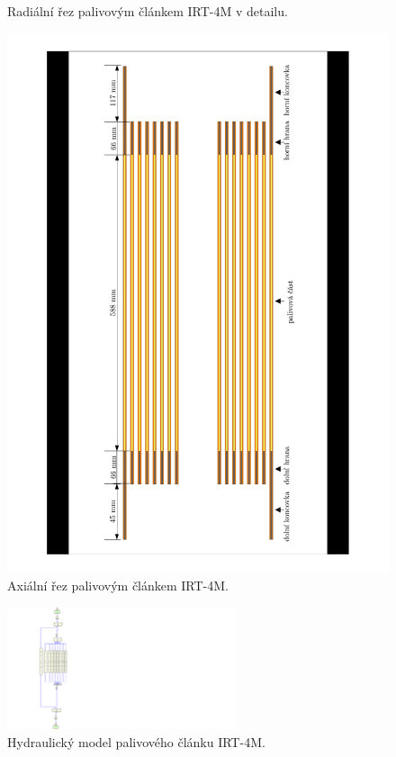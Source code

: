 \begin{figure}
\begin{minipage}{.5\textwidth}
{		\caption{Radiální řez palivovým článkem IRT-4M v detailu.}
		\label{fig:detail_irt_serpent}
	}
	\end{minipage}%
	\begin{minipage}{.5\textwidth}
		\centering
		\includegraphics[width=.8\textwidth, trim={5cm 1.5cm 5cm 1.5cm},clip]{./04_TH_model_IRT/obrazky/serpent_irt_ver_2.pdf}
		\caption{Axiální řez palivovým článkem IRT-4M.}
		\label{fig:ax_irt_serpent}
	\end{minipage}
\end{figure}
\begin{figure}
	\centering
	\includegraphics[width=0.6\textwidth, trim={5.5cm 0cm 35cm 0cm},clip]{./04_TH_model_IRT/obrazky/hydraulic_irt_relap.pdf}
	\caption{Hydraulický model palivového článku IRT-4M.}
	\label{fig:irt_hydraulic_relap}
\end{figure}
\newpage

